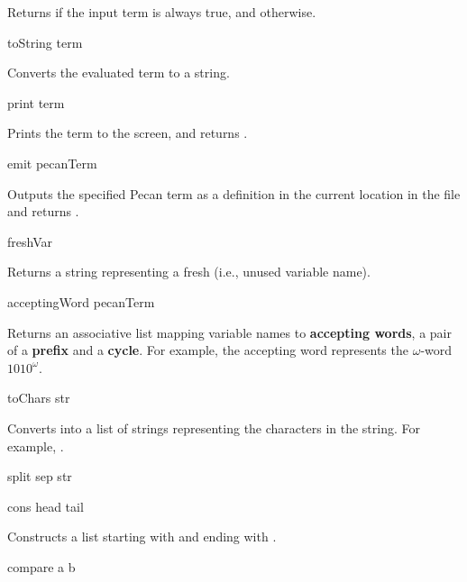 Returns  if the input term is always true, and  otherwise.

\begin{pecan}
toString term
\end{pecan}

Converts the evaluated term to a string.

\begin{pecan}
print term
\end{pecan}

Prints the term to the screen, and returns .

\begin{pecan}
emit pecanTerm
\end{pecan}

Outputs the specified Pecan term as a definition in the current location in the file and returns .

\begin{pecan}
freshVar
\end{pecan}

Returns a string representing a fresh (i.e., unused variable name).

\begin{pecan}
acceptingWord pecanTerm
\end{pecan}

Returns an associative list mapping variable names to \textbf{accepting words}, a pair of a \textbf{prefix} and a \textbf{cycle}.
For example, the accepting word  represents the $\omega$-word $1010^\omega$.

\begin{pecan}
toChars str
\end{pecan}

Converts  into a list of strings representing the characters in the string.
For example, .

\begin{pecan}
split sep str
\end{pecan}

\begin{pecan}
cons head tail
\end{pecan}

Constructs a list starting with  and ending with .

\begin{pecan}
compare a b
\end{pecan}

